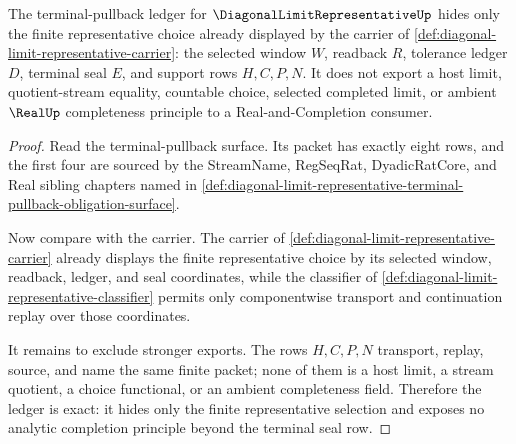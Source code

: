 \begin{theorem}
\label{thm:diagonal-limit-representative-terminal-pullback-ledger-exactness}
The terminal-pullback ledger for $\DiagonalLimitRepresentativeUp$ hides only the finite representative choice already displayed by the carrier of \autoref{def:diagonal-limit-representative-carrier}: the selected window $W$, readback $R$, tolerance ledger $D$, terminal seal $E$, and support rows $H,C,P,N$. It does not export a host limit, quotient-stream equality, countable choice, selected completed limit, or ambient $\RealUp$ completeness principle to a Real-and-Completion consumer.
\end{theorem}
\begin{proof}
Read the terminal-pullback surface. Its packet has exactly eight rows, and the first four are sourced by the StreamName, RegSeqRat, DyadicRatCore, and Real sibling chapters named in \autoref{def:diagonal-limit-representative-terminal-pullback-obligation-surface}.

Now compare with the carrier. The carrier of \autoref{def:diagonal-limit-representative-carrier} already displays the finite representative choice by its selected window, readback, ledger, and seal coordinates, while the classifier of \autoref{def:diagonal-limit-representative-classifier} permits only componentwise transport and continuation replay over those coordinates.

It remains to exclude stronger exports. The rows $H,C,P,N$ transport, replay, source, and name the same finite packet; none of them is a host limit, a stream quotient, a choice functional, or an ambient completeness field. Therefore the ledger is exact: it hides only the finite representative selection and exposes no analytic completion principle beyond the terminal seal row.
\end{proof}
